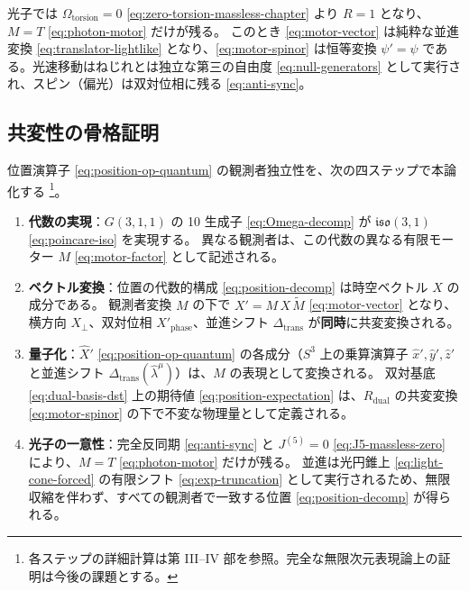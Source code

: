 \documentclass[dvipdfmx,a4paper,oneside]{jsbook}
\numberwithin{equation}{chapter}
\begin{document}
光子では \(\Omega_{\mathrm{torsion}} = 0\) \eqref{eq:zero-torsion-massless-chapter} より \(R = 1\) となり、\(M = T\) \eqref{eq:photon-motor} だけが残る。
このとき \eqref{eq:motor-vector} は純粋な並進変換 \eqref{eq:translator-lightlike} となり、\eqref{eq:motor-spinor} は恒等変換 \(\psi' = \psi\) である。光速移動はねじれとは独立な第三の自由度 \eqref{eq:null-generators} として実行され、スピン（偏光）は双対位相に残る \eqref{eq:anti-sync}。

\subsection{共変性の骨格証明}

位置演算子 \eqref{eq:position-op-quantum} の観測者独立性を、次の四ステップで本論化する \footnote{各ステップの詳細計算は第 III--IV 部を参照。完全な無限次元表現論上の証明は今後の課題とする。}。

\begin{enumerate}[leftmargin=2em]
  \item \textbf{代数の実現}：\(G(3,1,1)\) の 10 生成子 \eqref{eq:Omega-decomp} が \(\mathfrak{iso}(3,1)\) \eqref{eq:poincare-iso} を実現する。
  異なる観測者は、この代数の異なる有限モーター \(M\) \eqref{eq:motor-factor} として記述される。

  \item \textbf{ベクトル変換}：位置の代数的構成 \eqref{eq:position-decomp} は時空ベクトル \(X\) の成分である。
  観測者変換 \(M\) の下で \(X' = M\,X\,\widetilde{M}\) \eqref{eq:motor-vector} となり、横方向 \(X_\perp\)、双対位相 \(X'_{\mathrm{phase}}\)、並進シフト \(\Delta_{\mathrm{trans}}\) が\textbf{同時}に共変変換される。

  \item \textbf{量子化}：\(\hat{X}'\) \eqref{eq:position-op-quantum} の各成分（\(S^3\) 上の乗算演算子 \(\hat{x}', \hat{y}', \hat{z}'\) と並進シフト \(\Delta_{\mathrm{trans}}(\hat{\lambda}^\mu)\)）は、\(M\) の表現として変換される。
  双対基底 \eqref{eq:dual-basis-dst} 上の期待値 \eqref{eq:position-expectation} は、\(R_{\mathrm{dual}}\) の共変変換 \eqref{eq:motor-spinor} の下で不変な物理量として定義される。

  \item \textbf{光子の一意性}：完全反同期 \eqref{eq:anti-sync} と \(J^{(5)} = 0\) \eqref{eq:J5-massless-zero} により、\(M = T\) \eqref{eq:photon-motor} だけが残る。
  並進は光円錐上 \eqref{eq:light-cone-forced} の有限シフト \eqref{eq:exp-truncation} として実行されるため、無限収縮を伴わず、すべての観測者で一致する位置 \eqref{eq:position-decomp} が得られる。
\end{enumerate}
\end{document}
